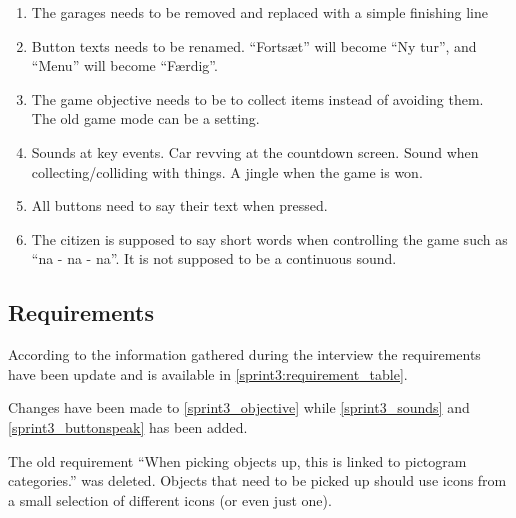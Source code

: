 \begin{enumerate}
\item The garages needs to be removed and replaced with a simple finishing line
\item Button texts needs to be renamed. ``Fortsæt'' will become ``Ny tur'', and ``Menu'' will become ``Færdig''.
\item The game objective needs to be to collect items instead of avoiding them. The old game mode can be a setting.
\item Sounds at key events. Car revving at the countdown screen. Sound when collecting/colliding with things.
A jingle when the game is won.
\item All buttons need to say their text when pressed.
\item The citizen is supposed to say short words when controlling the game such as ``na - na - na''. It is not supposed to be a continuous sound.
\end{enumerate}

\subsection{Requirements}
According to the information gathered during the interview the requirements have been update and is available in \cref{sprint3:requirement_table}.

Changes have been made to \cref{sprint3_objective} while \cref{sprint3_sounds} and \cref{sprint3_buttonspeak} has been added.

The old requirement ``When picking objects up, this is linked to pictogram categories.'' was deleted. 
Objects that need to be picked up should use icons from a small selection of different icons (or even just one).

